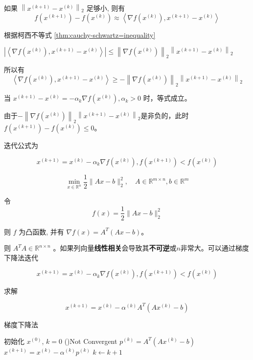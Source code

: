 如果 $ \left\|x^{(k+1)}-x^{(k)}\right\|_{2} $ 足够小, 则有
$$
f\left(x^{(k+1)}\right)-f\left(x^{(k)}\right) \approx\left\langle\nabla f\left(x^{(k)}\right), x^{(k+1)}-x^{(k)}\right\rangle
$$

\begin{corollary}
    根据柯西不等式 \ref{thm:cauchy-schwartz=inequality}

    $ \left|\left\langle\nabla f\left(x^{(k)}\right), x^{(k+1)}-x^{(k)}\right\rangle\right| \leq\left\|\nabla f\left(x^{(k)}\right)\right\|_{2}\left\|x^{(k+1)}-x^{(k)}\right\|_{2} $

    所以有
    $$
\left\langle\nabla f\left(x^{(k)}\right), x^{(k+1)}-x^{(k)}\right\rangle \geq -\left\|\nabla f\left(x^{(k)}\right)\right\|_{2}\left\|x^{(k+1)}-x^{(k)}\right\|_{2}
$$

当 $ x^{(k+1)}-x^{(k)}=-\alpha_{k} \nabla f\left(x^{(k)}\right), \alpha_{k}>0 $ 时，等式成立。

由于$-\left\|\nabla f\left(x^{(k)}\right)\right\|_{2}\left\|x^{(k+1)}-x^{(k)}\right\|_{2}$是非负的，此时$f\left(x^{(k+1)}\right)-f\left(x^{(k)}\right) \le 0$。
\end{corollary}

迭代公式为 

$$  x^{(k+1)}=x^{(k)}-\alpha_{k} \nabla f\left(x^{(k)}\right) , f\left(x^{(k+1)}\right)<f\left(x^{(k)}\right) $$


\begin{definition}[梯度下降法求解最小二乘法]
    $$
\min _{x \in \mathbb{R}^{n}} \frac{1}{2}\|A x-b\|_{2}^{2}, \quad A \in \mathbb{R}^{m \times n}, b \in \mathbb{R}^{m}
$$

令 $$ f(x)=\frac{1}{2}\|A x-b\|_{2}^{2} $$

则 $ f $ 为凸函数, 并有 $ \nabla f(x)=A^{T}(A x-b) $。

则 $ A^{T} A \in \mathbb{R}^{n \times n} $ 。如果列向量\textbf{线性相关}会导致其\textbf{不可逆}或$n$非常大。可以通过梯度下降法迭代

$$  x^{(k+1)}=x^{(k)}-\alpha_{k} \nabla f\left(x^{(k)}\right) , f\left(x^{(k+1)}\right)<f\left(x^{(k)}\right) $$

求解

$$ x^{(k+1)}=x^{(k)}-\alpha^{(k)} A^{T}\left(A x^{(k)}-b\right) $$
\end{definition}


\begin{algorithm}[htbp]
    \caption{梯度下降法}
    初始化 $ x^{(0)} $, $k=0$\;
    \While(){Not Convergent}{
        $p^{(k)}=A^{T}\left(A x^{(k)}-b\right)$\;
        $x^{(k+1)}=x^{(k)}-\alpha^{(k)} p^{(k)}$\;
        $k \leftarrow k + 1$
    }
\end{algorithm}

